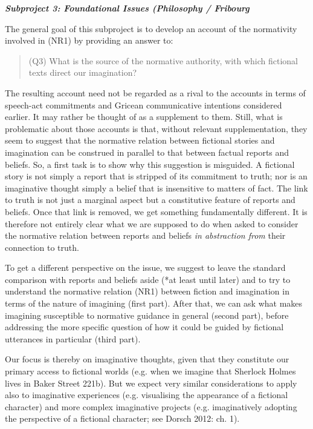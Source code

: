 \vspace{.2cm}
\noindent\textbf{\emph{Subproject 3: Foundational Issues (Philosophy / Fribourg}}
\vspace{.1cm}

The general goal of this subproject is to develop an account of the normativity involved in (NR1) by providing an answer to:

\vspace{-.2cm}
\begin{quote}
(Q3) What is the source of the normative authority, with which fictional texts direct our imagination?
\end{quote}
\vspace{-.2cm}

\noindent The resulting account need not be regarded as a rival to the accounts in terms of speech-act commitments and Gricean communicative intentions considered earlier. It may rather be thought of as a supplement to them. Still, what is problematic about those accounts is that, without relevant supplementation, they seem to suggest that the normative relation between fictional stories and imagination can be construed in parallel to that between factual reports and beliefs. So, a first task is to show why this suggestion is misguided. A fictional story is not simply a report that is stripped of its commitment to truth; nor is an imaginative thought simply a belief that is insensitive to matters of fact. The link to truth is not just a marginal aspect but a constitutive feature of reports and beliefs. Once that link is removed, we get something fundamentally different. It is therefore not entirely clear what we are supposed to do when asked to consider the normative relation between reports and beliefs \emph{in abstraction from} their connection to truth.

To get a different perspective on the issue, we suggest to leave the standard comparison with reports and beliefs aside (*at least until later) and to try to understand the normative relation (NR1) between fiction and imagination in terms of the nature of imagining (first part). After that, we can ask what makes imagining susceptible to normative guidance in general (second part), before addressing the more specific question of how it could be guided by fictional utterances in particular (third part).

Our focus is thereby on imaginative thoughts, given that they constitute our primary access to fictional worlds (e.g. when we imagine that Sherlock Holmes lives in Baker Street 221b). But we expect very similar considerations to apply also to imaginative experiences (e.g. visualising the appearance of a fictional character) and more complex imaginative projects (e.g. imaginatively adopting the perspective of a fictional character; see Dorsch 2012: ch. 1).

